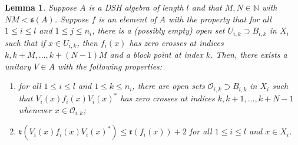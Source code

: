 \documentclass[12pt]{amsart}
\numberwithin{equation}{section}
\newtheorem{lemma}[theorem]{Lemma}
\theoremstyle{definition}
\theoremstyle{remark}
\newcommand{\NN}{\mathbb{N}}
\begin{document}
\begin{lemma}
	\label{cross shift}
	Suppose $A$ is a DSH algebra of length $ l $ and that $M,N\in\NN$ with $NM<\mathfrak{s}(A)$. Suppose $f$ is an element of $A$ with the property that for all $1\leq i\leq  l $ and $1\leq j\leq n_{i}$, there is a (possibly empty) open set $U_{i,k}\supset B_{i,k}$ in $X_{i}$ such that if $x\in U_{i,k}$, then $f_{i}(x)$ has zero crosses at indices $k,k+M,\ldots,k+(N-1)M$ and a block point at index $k$. Then, there exists a unitary $V\in A$ with the following properties:
	\begin{enumerate}
		\item for all $1\leq i\leq l $ and $1\leq k\leq n_{i}$, there are open sets $\mathcal{O}_{i,k}\supset B_{i,k}$ in $X_{i}$ such that $V_{i}(x)f_{i}(x)V_{i}(x)^{*}$ has zero crosses at indices $k,k+1,\ldots,k+N-1$ whenever $x\in \mathcal{O}_{i,k}$;
		\item$\mathfrak{r}(V_{i}(x)f_{i}(x)V_{i}(x)^{*})\leq \mathfrak{r}(f_{i}(x))+2$ for all $1\leq i\leq  l $ and $x\in X_{i}$.
	\end{enumerate} 
\end{lemma}
\end{document}

